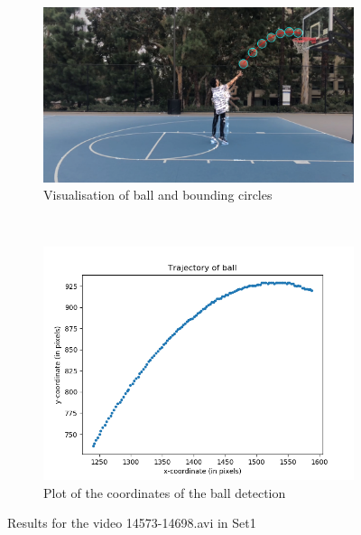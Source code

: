 \documentclass[12pt]{article}
\begin{document}
\begin{figure}[H]
    \centering
    \begin{subfigure}[b]{0.7\textwidth}
         \centering
         \includegraphics[width=\textwidth]{../results/visualisations/output_Set1_14573-14698.png}
         \caption{Visualisation of ball and bounding circles}
     \end{subfigure}\\
     \begin{subfigure}[b]{0.7\textwidth}
         \centering
         \includegraphics[width=\textwidth]{../results/plots/Set1_14573-14698.png}
         \caption{Plot of the coordinates of the ball detection}
     \end{subfigure}
     \caption{Results for the video 14573-14698.avi in Set1}
\end{figure}
\end{document}
